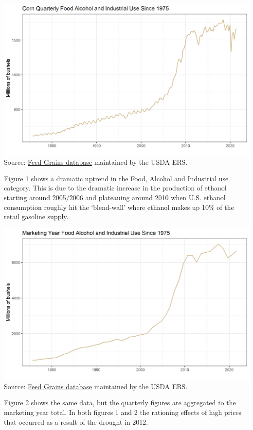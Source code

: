 \documentclass[
  letterpaper,
  DIV=11,
  numbers=noendperiod]{scrreprt}
\begin{document}
\includegraphics{assets/ForecastingUseof-CornUseCategoriesFoodAlcoholInd.png}
Source:
\href{http://www.ers.usda.gov/data-products/feed-grains-database/feed-grains-yearbook-tables.aspx\#26780}{Feed
Grains database} maintained by the USDA ERS.

Figure 1 shows a dramatic uptrend in the Food, Alcohol and Industrial
use category. This is due to the dramatic increase in the production of
ethanol starting around 2005/2006 and plateauing around 2010 when U.S.
ethanol consumption roughly hit the `blend-wall' where ethanol makes up
10\% of the retail gasoline supply.

\includegraphics{assets/ForecastingUseof-CornUseCategoriesFoodAlcoholIndMY.png}
Source:
\href{http://www.ers.usda.gov/data-products/feed-grains-database/feed-grains-yearbook-tables.aspx\#26780}{Feed
Grains database} maintained by the USDA ERS.

Figure 2 shows the same data, but the quarterly figures are aggregated
to the marketing year total. In both figures 1 and 2 the rationing
effects of high prices that occurred as a result of the drought in 2012.
\end{document}
